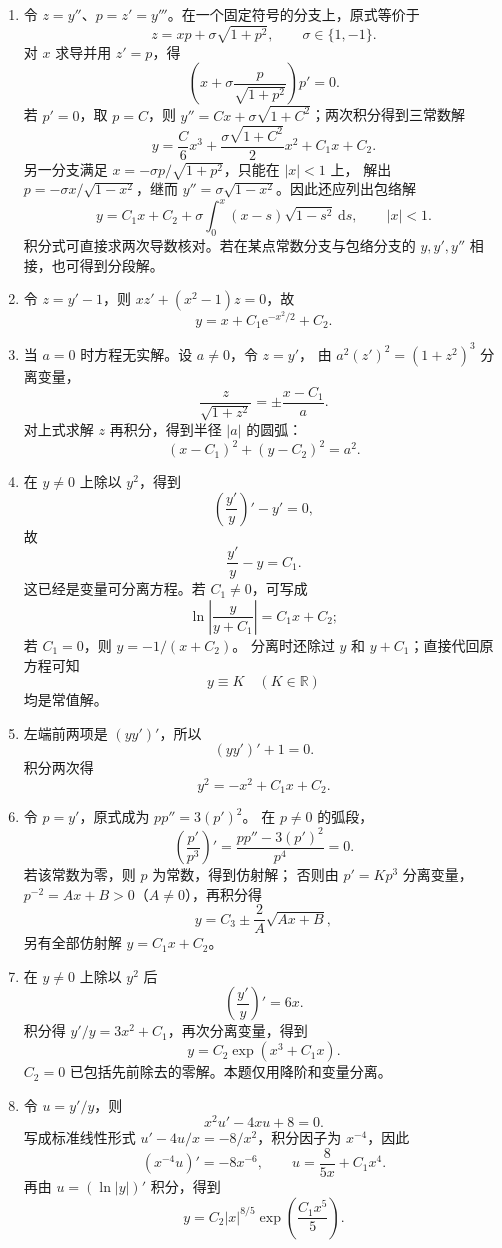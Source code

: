 \documentclass[UTF8,a4paper,11pt]{ctexart}
\newcommand{\dd}{\,\mathrm d}
\newcommand{\e}{\mathrm e}
\begin{document}
\begin{solution}
\begin{enumerate}[label=(\arabic*)]
\item 令 $z=y''$、$p=z'=y'''$。在一个固定符号的分支上，原式等价于
\[
z=xp+\sigma\sqrt{1+p^2},\qquad \sigma\in\{1,-1\}.
\]
对 $x$ 求导并用 $z'=p$，得
\[
\left(x+\sigma\frac{p}{\sqrt{1+p^2}}\right)p'=0.
\]
若 $p'=0$，取 $p=C$，则
$y''=Cx+\sigma\sqrt{1+C^2}$；两次积分得到三常数解
\[
\boxed{y=\frac C6x^3+
\frac{\sigma\sqrt{1+C^2}}2x^2+C_1x+C_2}.
\]
另一分支满足
$x=-\sigma p/\sqrt{1+p^2}$，只能在 $|x|<1$ 上，
解出 $p=-\sigma x/\sqrt{1-x^2}$，继而
$y''=\sigma\sqrt{1-x^2}$。因此还应列出包络解
\[
\boxed{y=C_1x+C_2+
\sigma\int_{0}^{x}(x-s)\sqrt{1-s^2}\dd s},\qquad |x|<1.
\]
积分式可直接求两次导数核对。若在某点常数分支与包络分支的 $y,y',y''$ 相接，也可得到分段解。
\item 令 $z=y'-1$，则 $xz'+(x^2-1)z=0$，故
\[
\boxed{y=x+C_1\e^{-x^2/2}+C_2}.
\]
\item 当 $a=0$ 时方程无实解。设 $a\ne0$，令 $z=y'$，
由 $a^2(z')^2=(1+z^2)^3$ 分离变量，
\[
\frac{z}{\sqrt{1+z^2}}=\pm\frac{x-C_1}{a}.
\]
对上式求解 $z$ 再积分，得到半径 $|a|$ 的圆弧：
\[
\boxed{(x-C_1)^2+(y-C_2)^2=a^2}.
\]
\item 在 $y\ne0$ 上除以 $y^2$，得到
\[
\left(\frac{y'}y\right)'-y'=0,
\]
故
\[
\boxed{\frac{y'}y-y=C_1}.
\]
这已经是变量可分离方程。若 $C_1\ne0$，可写成
\[
\boxed{\ln\left|\frac{y}{y+C_1}\right|=C_1x+C_2};
\]
若 $C_1=0$，则 $y=-1/(x+C_2)$。
分离时还除过 $y$ 和 $y+C_1$；直接代回原方程可知
\[
\boxed{y\equiv K\quad(K\in\mathbb R)}
\]
均是常值解。
\item 左端前两项是 $(yy')'$，所以
\[
(yy')'+1=0.
\]
积分两次得
\[
\boxed{y^2=-x^2+C_1x+C_2}.
\]
\item 令 $p=y'$，原式成为 $pp''=3(p')^2$。
在 $p\ne0$ 的弧段，
\[
\left(\frac{p'}{p^3}\right)'
=\frac{pp''-3(p')^2}{p^4}=0.
\]
若该常数为零，则 $p$ 为常数，得到仿射解；
否则由 $p'=Kp^3$ 分离变量，
$p^{-2}=Ax+B>0$（$A\ne0$），再积分得
\[
\boxed{y=C_3\pm\frac{2}{A}\sqrt{Ax+B}},
\]
另有全部仿射解 $\boxed{y=C_1x+C_2}$。
\item 在 $y\ne0$ 上除以 $y^2$ 后
\[
\left(\frac{y'}{y}\right)'=6x.
\]
积分得 $y'/y=3x^2+C_1$，再次分离变量，得到
\[
\boxed{y=C_2\exp(x^3+C_1x)}.
\]
$C_2=0$ 已包括先前除去的零解。本题仅用降阶和变量分离。
\item 令 $u=y'/y$，则
\[
x^2u'-4xu+8=0.
\]
写成标准线性形式 $u'-4u/x=-8/x^2$，积分因子为 $x^{-4}$，因此
\[
(x^{-4}u)'=-8x^{-6},\qquad
u=\frac{8}{5x}+C_1x^4.
\]
再由 $u=(\ln|y|)'$ 积分，得到
\[
\boxed{y=C_2|x|^{8/5}\exp\!\left(\frac{C_1x^5}{5}\right)}.
\]
\end{enumerate}
\end{solution}
\end{document}
